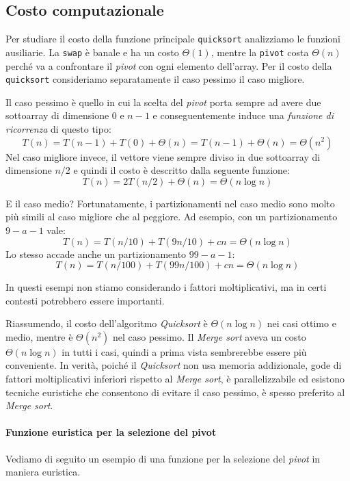 \subsection{Costo computazionale}
Per studiare il costo della funzione principale \texttt{quicksort} analizziamo
le funzioni ausiliarie. La \texttt{swap} è banale e ha un costo
$\Theta(1)$, mentre la \texttt{pivot} costa $\Theta(n)$ perché va a confrontare
il \emph{pivot} con ogni elemento dell'array. Per il costo della
\texttt{quicksort} consideriamo separatamente il caso pessimo il caso migliore.

\bigskip\noindent
Il caso pessimo è quello in cui la scelta del \emph{pivot} porta sempre ad avere
due sottoarray di dimensione $0$ e $n-1$ e conseguentemente induce una
\emph{funzione di ricorrenza} di questo tipo:
\[T(n)=T(n-1)+T(0)+\Theta(n)=T(n-1)+\Theta(n)=\Theta(n^2)\]
Nel caso migliore invece, il vettore viene sempre diviso in due sottoarray di
dimensione $n/2$ e quindi il costo è descritto dalla seguente funzione:
\[T(n)=2T(n/2)+\Theta(n)=\Theta(n\log n)\]

\bigskip\noindent
E il caso medio?
Fortunatamente, i partizionamenti nel caso medio sono molto più simili al caso
migliore che al peggiore. Ad esempio, con un partizionamento $9-a-1$ vale:
\[T(n)=T(n/10)+T(9n/10)+cn=\Theta(n\log n)\]
Lo stesso accade anche un partizionamento $99-a-1$:
\[T(n)=T(n/100)+T(99n/100)+cn=\Theta(n\log n)\]
\begin{note}
    In questi esempi non stiamo considerando i fattori moltiplicativi, ma in
    certi contesti potrebbero essere importanti.
\end{note}\noindent
Riassumendo, il costo dell'algoritmo \emph{Quicksort} è $\Theta(n\log n)$ nei
casi ottimo e medio, mentre è $\Theta(n^2)$ nel caso pessimo. Il \emph{Merge sort}
aveva un costo $\Theta(n\log n)$ in tutti i casi, quindi a prima vista
sembrerebbe essere più conveniente. In verità, poiché il \emph{Quicksort}
non usa memoria addizionale, gode di fattori moltiplicativi inferiori rispetto al
\emph{Merge sort}, è parallelizzabile ed esistono tecniche euristiche che consentono
di evitare il caso pessimo, è spesso preferito al \emph{Merge sort}.

\paragraph{Funzione euristica per la selezione del pivot}
Vediamo di seguito un esempio di una funzione per la selezione del \emph{pivot}
in maniera euristica.

